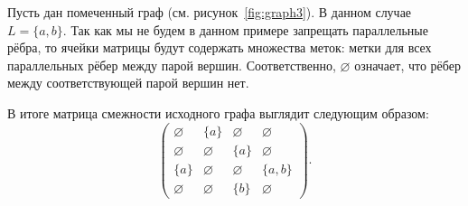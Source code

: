 \begin{marginfigure}
    \begin{center}
        \resizebox{\marginparwidth}{!}{}
    \end{center}
    \caption{Помеченный граф}
    \label{fig:graph3}
\end{marginfigure}
\begin{example}
    \label{exmpl:matrix_for_labelled_graph}
    Пусть дан помеченный граф (см. рисунок~\ref{fig:graph3}).
    В данном случае $L = \{a,b\}$.
    Так как мы не будем в данном примере запрещать параллельные рёбра, то ячейки матрицы будут содержать множества меток: метки для всех параллельных рёбер между парой вершин.
    Соответственно,  $\varnothing$ означает, что рёбер между соответствующей парой вершин нет.

    В итоге матрица смежности исходного графа выглядит следующим образом:
    \[
        \begin{pmatrix}
            \varnothing & \{a\}       & \varnothing & \varnothing \\
            \varnothing & \varnothing & \{a\}       & \varnothing \\
            \{a\}       & \varnothing & \varnothing & \{a,b\}     \\
            \varnothing & \varnothing & \{b\}       & \varnothing
        \end{pmatrix}.
    \]
\end{example}

